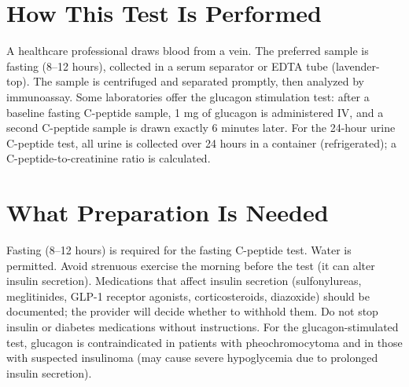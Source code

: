 \section*{How This Test Is Performed}
A healthcare professional draws blood from a vein. The preferred sample is fasting (8--12 hours), collected in a serum separator or EDTA tube (lavender-top). The sample is centrifuged and separated promptly, then analyzed by immunoassay. Some laboratories offer the glucagon stimulation test: after a baseline fasting C-peptide sample, 1 mg of glucagon is administered IV, and a second C-peptide sample is drawn exactly 6 minutes later. For the 24-hour urine C-peptide test, all urine is collected over 24 hours in a container (refrigerated); a C-peptide-to-creatinine ratio is calculated.

\section*{What Preparation Is Needed}
Fasting (8--12 hours) is required for the fasting C-peptide test. Water is permitted. Avoid strenuous exercise the morning before the test (it can alter insulin secretion). Medications that affect insulin secretion (sulfonylureas, meglitinides, GLP-1 receptor agonists, corticosteroids, diazoxide) should be documented; the provider will decide whether to withhold them. Do not stop insulin or diabetes medications without instructions. For the glucagon-stimulated test, glucagon is contraindicated in patients with pheochromocytoma and in those with suspected insulinoma (may cause severe hypoglycemia due to prolonged insulin secretion).

